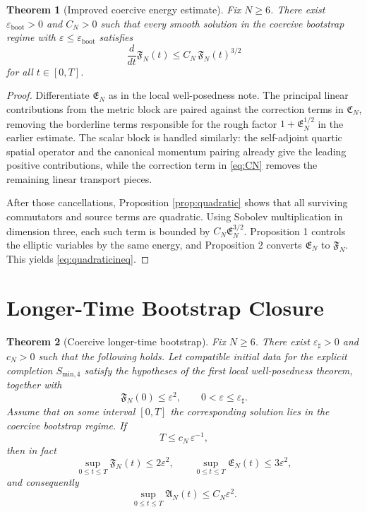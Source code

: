 \documentclass[11pt]{article}
\newtheorem{theorem}{Theorem}
\begin{document}
\begin{theorem}[Improved coercive energy estimate]
Fix \(N\ge 6\). There exist \(\varepsilon_{\mathrm{boot}}>0\) and \(C_N>0\) such that every smooth solution in the coercive bootstrap regime with \(\varepsilon\le \varepsilon_{\mathrm{boot}}\) satisfies
\begin{equation}
\frac{d}{dt}\mathfrak F_N(t)
\le
C_N\,\mathfrak F_N(t)^{3/2}
\label{eq:quadraticineq}
\end{equation}
for all \(t\in[0,T]\).
\end{theorem}

\begin{proof}
Differentiate \(\mathfrak E_N\) as in the local well-posedness note. The principal linear contributions from the metric block are paired against the correction terms in \(\mathfrak C_N\), removing the borderline terms responsible for the rough factor \(1+\mathfrak E_N^{1/2}\) in the earlier estimate. The scalar block is handled similarly: the self-adjoint quartic spatial operator and the canonical momentum pairing already give the leading positive contributions, while the correction term in \eqref{eq:CN} removes the remaining linear transport pieces.

After those cancellations, Proposition \ref{prop:quadratic} shows that all surviving commutators and source terms are quadratic. Using Sobolev multiplication in dimension three, each such term is bounded by \(C_N\mathfrak E_N^{3/2}\). Proposition 1 controls the elliptic variables by the same energy, and Proposition 2 converts \(\mathfrak E_N\) to \(\mathfrak F_N\). This yields \eqref{eq:quadraticineq}.
\end{proof}

\section{Longer-Time Bootstrap Closure}

\begin{theorem}[Coercive longer-time bootstrap]
Fix \(N\ge 6\). There exist \(\varepsilon_\sharp>0\) and \(c_N>0\) such that the following holds. Let compatible initial data for the explicit completion \(S_{\mathrm{min},4}\) satisfy the hypotheses of the first local well-posedness theorem, together with
\begin{equation}
\mathfrak F_N(0)\le \varepsilon^2,
\qquad
0<\varepsilon\le \varepsilon_\sharp.
\label{eq:initsmall}
\end{equation}
Assume that on some interval \([0,T]\) the corresponding solution lies in the coercive bootstrap regime. If
\begin{equation}
T\le c_N\,\varepsilon^{-1},
\label{eq:Tbootstrap}
\end{equation}
then in fact
\begin{equation}
\sup_{0\le t\le T}\mathfrak F_N(t)\le 2\varepsilon^2,
\qquad
\sup_{0\le t\le T}\mathfrak E_N(t)\le 3\varepsilon^2,
\label{eq:bootstrapimprove}
\end{equation}
and consequently
\begin{equation}
\sup_{0\le t\le T}\mathfrak A_N(t)\le C_N\varepsilon^2.
\label{eq:auximprove}
\end{equation}
\end{theorem}
\end{document}

